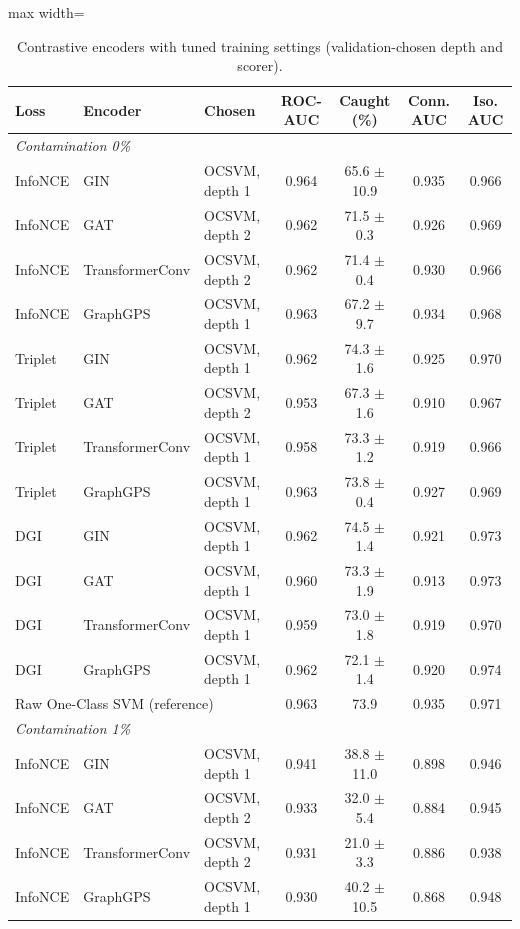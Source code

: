 \begin{table}[htbp]
\centering
\footnotesize
\caption{Contrastive encoders with tuned training settings (validation-chosen depth and scorer).}
\label{tab:contrastive-tuned}
\begin{adjustbox}{max width=\linewidth}
\begin{tabular}{lllcccc}
\toprule
Loss & Encoder & Chosen & ROC-AUC & Caught (\%) & Conn. AUC & Iso. AUC \\
\midrule
\multicolumn{7}{l}{\textit{Contamination 0\%}} \\
InfoNCE & GIN & OCSVM, depth 1 & 0.964 & 65.6 $\pm$ 10.9 & 0.935 & 0.966 \\
InfoNCE & GAT & OCSVM, depth 2 & 0.962 & 71.5 $\pm$ 0.3 & 0.926 & 0.969 \\
InfoNCE & TransformerConv & OCSVM, depth 2 & 0.962 & 71.4 $\pm$ 0.4 & 0.930 & 0.966 \\
InfoNCE & GraphGPS & OCSVM, depth 1 & 0.963 & 67.2 $\pm$ 9.7 & 0.934 & 0.968 \\
Triplet & GIN & OCSVM, depth 1 & 0.962 & 74.3 $\pm$ 1.6 & 0.925 & 0.970 \\
Triplet & GAT & OCSVM, depth 2 & 0.953 & 67.3 $\pm$ 1.6 & 0.910 & 0.967 \\
Triplet & TransformerConv & OCSVM, depth 1 & 0.958 & 73.3 $\pm$ 1.2 & 0.919 & 0.966 \\
Triplet & GraphGPS & OCSVM, depth 1 & 0.963 & 73.8 $\pm$ 0.4 & 0.927 & 0.969 \\
DGI & GIN & OCSVM, depth 1 & 0.962 & 74.5 $\pm$ 1.4 & 0.921 & 0.973 \\
DGI & GAT & OCSVM, depth 1 & 0.960 & 73.3 $\pm$ 1.9 & 0.913 & 0.973 \\
DGI & TransformerConv & OCSVM, depth 1 & 0.959 & 73.0 $\pm$ 1.8 & 0.919 & 0.970 \\
DGI & GraphGPS & OCSVM, depth 1 & 0.962 & 72.1 $\pm$ 1.4 & 0.920 & 0.974 \\
\multicolumn{3}{l}{Raw One-Class SVM (reference)} & 0.963 & 73.9 & 0.935 & 0.971 \\
\multicolumn{7}{l}{\textit{Contamination 1\%}} \\
InfoNCE & GIN & OCSVM, depth 1 & 0.941 & 38.8 $\pm$ 11.0 & 0.898 & 0.946 \\
InfoNCE & GAT & OCSVM, depth 2 & 0.933 & 32.0 $\pm$ 5.4 & 0.884 & 0.945 \\
InfoNCE & TransformerConv & OCSVM, depth 2 & 0.931 & 21.0 $\pm$ 3.3 & 0.886 & 0.938 \\
InfoNCE & GraphGPS & OCSVM, depth 1 & 0.930 & 40.2 $\pm$ 10.5 & 0.868 & 0.948 \\

\end{tabular}
\end{adjustbox}
\end{table}

